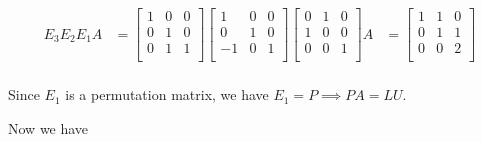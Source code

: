 \documentclass[12pt,letterpaper]{article}
\begin{document}
\begin{enumerate}
\begin{enumerate}
\begin{itemize}
\begin{align*}
                \\
                E_3E_2E_1A
                &=
                \begin{bmatrix}
                   1 &  0 &  0 \\
                   0 &  1 &  0 \\
                   0 &  1 &  1 \\
                \end{bmatrix}
                \begin{bmatrix}
                   1 &  0 &  0 \\
                   0 &  1 &  0 \\
                  -1 &  0 &  1 \\
                \end{bmatrix}
                \begin{bmatrix}
                   0 &  1 &  0 \\
                   1 &  0 &  0 \\
                   0 &  0 &  1 \\
                \end{bmatrix}
                A
                &=
                \begin{bmatrix}
                   1 &  1 &  0 \\
                   0 &  1 &  1 \\
                   0 &  0 &  2 \\
                \end{bmatrix}
                \\
              \end{align*}

              Since $E_1$ is a permutation matrix,
              we have $E_1 = P \implies PA = LU$.

              Now we have


\end{itemize}
\end{enumerate}
\end{enumerate}
\end{document}
